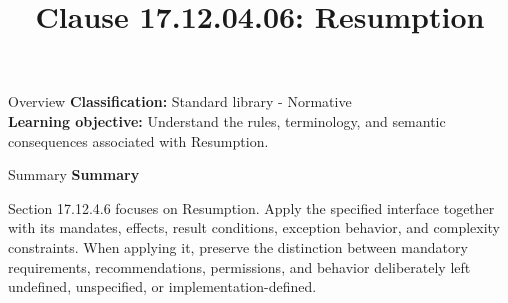 \documentclass[10pt,letterpaper]{article}
\title{Clause 17.12.04.06: Resumption}
\author{}
\date{}
\begin{document}
\maketitle
\begin{CornellOverviewBox}{Overview}
\textbf{Classification:} Standard library - Normative\\[2pt]
\textbf{Learning objective:} Understand the rules, terminology, and semantic consequences associated with Resumption.
\end{CornellOverviewBox}\begin{CornellSummaryBox}{Summary}
{\sffamily\bfseries\color{Accent} Summary}\par\vspace{3pt}Section 17.12.4.6 focuses on Resumption. Apply the specified interface together with its mandates, effects, result conditions, exception behavior, and complexity constraints. When applying it, preserve the distinction between mandatory requirements, recommendations, permissions, and behavior deliberately left undefined, unspecified, or implementation-defined.
\end{CornellSummaryBox}
\end{document}
